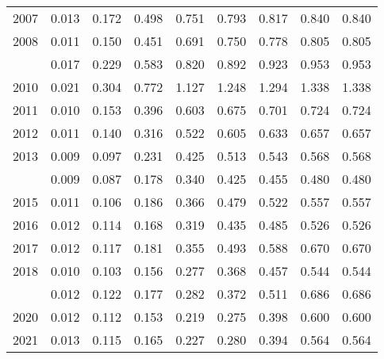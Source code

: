 \documentclass[
]{article}
\begin{document}
\begin{longtable}[t]{lrrrrrrrr}
2007 & 0.013 & 0.172 & 0.498 & 0.751 & 0.793 & 0.817 & 0.840 & 0.840\\
2008 & 0.011 & 0.150 & 0.451 & 0.691 & 0.750 & 0.778 & 0.805 & 0.805\\
\addlinespace
2009 & 0.017 & 0.229 & 0.583 & 0.820 & 0.892 & 0.923 & 0.953 & 0.953\\
2010 & 0.021 & 0.304 & 0.772 & 1.127 & 1.248 & 1.294 & 1.338 & 1.338\\
2011 & 0.010 & 0.153 & 0.396 & 0.603 & 0.675 & 0.701 & 0.724 & 0.724\\
2012 & 0.011 & 0.140 & 0.316 & 0.522 & 0.605 & 0.633 & 0.657 & 0.657\\
2013 & 0.009 & 0.097 & 0.231 & 0.425 & 0.513 & 0.543 & 0.568 & 0.568\\
\addlinespace
2014 & 0.009 & 0.087 & 0.178 & 0.340 & 0.425 & 0.455 & 0.480 & 0.480\\
2015 & 0.011 & 0.106 & 0.186 & 0.366 & 0.479 & 0.522 & 0.557 & 0.557\\
2016 & 0.012 & 0.114 & 0.168 & 0.319 & 0.435 & 0.485 & 0.526 & 0.526\\
2017 & 0.012 & 0.117 & 0.181 & 0.355 & 0.493 & 0.588 & 0.670 & 0.670\\
2018 & 0.010 & 0.103 & 0.156 & 0.277 & 0.368 & 0.457 & 0.544 & 0.544\\
\addlinespace
2019 & 0.012 & 0.122 & 0.177 & 0.282 & 0.372 & 0.511 & 0.686 & 0.686\\
2020 & 0.012 & 0.112 & 0.153 & 0.219 & 0.275 & 0.398 & 0.600 & 0.600\\
2021 & 0.013 & 0.115 & 0.165 & 0.227 & 0.280 & 0.394 & 0.564 & 0.564\\*
\end{longtable}
\end{document}
